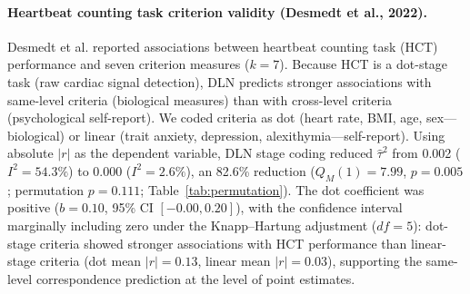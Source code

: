\documentclass[11pt]{article}
\begin{document}
\paragraph{Heartbeat counting task criterion validity (Desmedt et al.,
2022).}
Desmedt et al.\cite{Desmedt2022} reported associations between heartbeat
counting task (HCT) performance and seven criterion measures ($k = 7$).
Because HCT is a dot-stage task (raw cardiac signal detection), DLN
predicts stronger associations with same-level criteria (biological
measures) than with cross-level criteria (psychological self-report).
We coded criteria as dot (heart rate, BMI, age, sex---biological) or
linear (trait anxiety, depression, alexithymia---self-report). Using
absolute $|r|$ as the dependent variable, DLN stage coding reduced
$\hat\tau^2$ from 0.002 ($I^2 = 54.3\%$) to 0.000 ($I^2 = 2.6\%$),
an 82.6\% reduction ($Q_M(1) = 7.99$, $p = 0.005$;
permutation $p = 0.111$; Table~\ref{tab:permutation}). The dot coefficient was positive ($b = 0.10$,
95\% CI $[-0.00, 0.20]$), with the confidence interval marginally
including zero under the Knapp--Hartung adjustment ($df = 5$):
dot-stage criteria showed stronger associations with HCT performance
than linear-stage criteria (dot mean $|r| = 0.13$, linear mean
$|r| = 0.03$), supporting the same-level correspondence prediction
at the level of point estimates.
\end{document}
